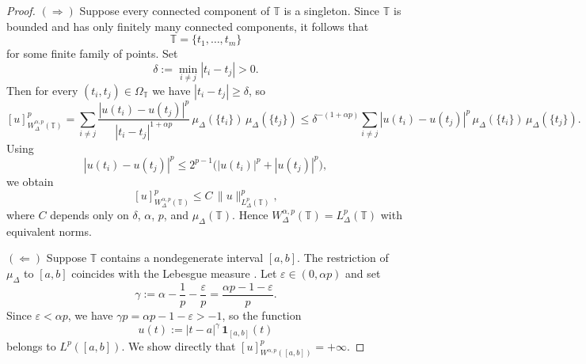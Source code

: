 \documentclass[11pt,a4paper]{article}
\numberwithin{equation}{section}
\theoremstyle{definition}
\newcommand{\T}{\mathbb{T}}
\begin{document}
\begin{proof}
$(\Rightarrow)$ Suppose every connected component of $\T$ is a singleton.
Since $\T$ is bounded and has only finitely many connected components, it follows that
\[
\T=\{t_1,\dots,t_m\}
\]
for some finite family of points. Set
\[
\delta:=\min_{i\neq j}|t_i-t_j|>0.
\]
Then for every $(t_i,t_j)\in\Omega_\T$ we have $|t_i-t_j|\ge\delta$, so
\[
[u]^p_{W^{\alpha,p}_\Delta(\T)}
= \sum_{i\neq j}
\frac{|u(t_i)-u(t_j)|^p}{|t_i-t_j|^{1+\alpha p}}\,
\mu_\Delta(\{t_i\})\,\mu_\Delta(\{t_j\})
\le \delta^{-(1+\alpha p)}
\sum_{i\neq j}|u(t_i)-u(t_j)|^p\,
\mu_\Delta(\{t_i\})\,\mu_\Delta(\{t_j\}).
\]
Using
\[
|u(t_i)-u(t_j)|^p\le 2^{p-1}\bigl(|u(t_i)|^p+|u(t_j)|^p\bigr),
\]
we obtain
\[
[u]^p_{W^{\alpha,p}_\Delta(\T)}
\le C\,\|u\|^p_{L^p_\Delta(\T)},
\]
where $C$ depends only on $\delta$, $\alpha$, $p$, and $\mu_\Delta(\T)$.
Hence $W^{\alpha,p}_\Delta(\T)=L^p_\Delta(\T)$ with equivalent norms.

$(\Leftarrow)$ Suppose $\T$ contains a nondegenerate interval $[a,b]$.
The restriction of $\mu_\Delta$ to $[a,b]$ coincides with the
Lebesgue measure \cite[Theorem~5.2]{CabadaVivero2006}.
Let $\varepsilon\in(0,\alpha p)$ and set
\[
\gamma := \alpha - \frac{1}{p} - \frac{\varepsilon}{p}
= \frac{\alpha p - 1 - \varepsilon}{p}.
\]
Since $\varepsilon < \alpha p$, we have $\gamma p = \alpha p - 1 - \varepsilon > -1$,
so the function
\[
u(t) := |t-a|^{\gamma}\,\mathbf{1}_{[a,b]}(t)
\]
belongs to $L^p([a,b])$. We show directly that
$[u]^p_{W^{\alpha,p}([a,b])}=+\infty$.


\end{proof}
\end{document}
